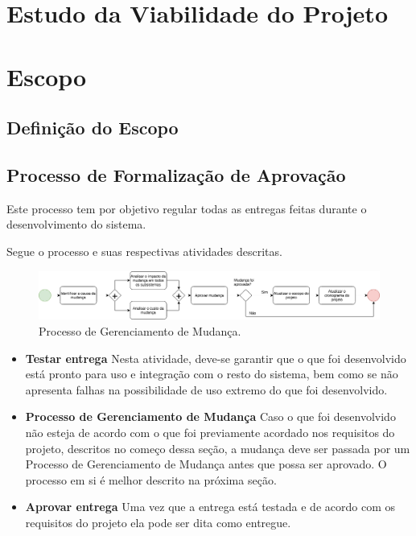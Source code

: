 \section{Estudo da Viabilidade do Projeto}

\section{Escopo}
\subsection{Definição do Escopo}

\subsection{Processo de Formalização de Aprovação}
    Este processo tem por objetivo regular todas as entregas feitas durante o desenvolvimento do sistema.

    Segue o processo e suas respectivas atividades descritas.

\begin{figure}[!ht]
	\centering
		\includegraphics{figuras/mudanca}
	\caption{Processo de Gerenciamento de Mudança.}
\end{figure}

\begin{itemize}
    \item \textbf{Testar entrega}
        Nesta atividade, deve-se garantir que o que foi desenvolvido está pronto para uso e integração com o resto do sistema, bem como se não apresenta falhas na possibilidade de uso extremo do que foi desenvolvido.

    \item \textbf{Processo de Gerenciamento de Mudança}
        Caso o que foi desenvolvido não esteja de acordo com o que foi previamente acordado nos requisitos do projeto, descritos no começo dessa seção, a mudança deve ser passada por um Processo de Gerenciamento de Mudança antes que possa ser aprovado. O processo em si é melhor descrito na próxima seção.

    \item \textbf{Aprovar entrega}
        Uma vez que a entrega está testada e de acordo com os requisitos do projeto ela pode ser dita como entregue.
\end{itemize}

